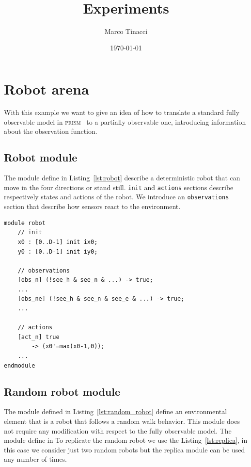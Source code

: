 \documentclass{article}
\date{\today}
\author{Marco Tinacci}
\title{Experiments}
\newcommand{\PRISM}{\textsc{prism}}
\begin{document}
\maketitle
\section*{Robot arena} %
\label{sec:robot_arena}

With this example we want to give an idea of how to translate a standard fully observable model in \PRISM{}~\cite{KwiatkowskaNP11} to a partially observable one, introducing information about the observation function.

\subsection*{Robot module} %
\label{sub:robot_module}

The module define in Listing~\ref{lst:robot} describe a deterministic robot that can move in the four directions or stand still. \texttt{init} and \texttt{actions} sections describe respectively states and actions of the robot. We introduce an \texttt{observations} section that describe how sensors react to the environment.

\begin{lstlisting}[caption=Robot module, label=lst:robot, captionpos=b, frame=single]
module robot
	// init
	x0 : [0..D-1] init ix0;
	y0 : [0..D-1] init iy0;

	// observations
	[obs_n] (!see_h & see_n & ...) -> true;
	...
	[obs_ne] (!see_h & see_n & see_e & ...) -> true;
	...

	// actions
	[act_n]	true 
		-> (x0'=max(x0-1,0));
	...
endmodule
\end{lstlisting}

\subsection*{Random robot module} %
\label{sub:random_robot_module}

The module defined in Listing~\ref{lst:random_robot} define an environmental element that is a robot that follows a random walk behavior. This module does not require any modification with respect to the fully observable model. The module define in To replicate the random robot we use the Listing~\ref{lst:replica}, in this case we consider just two random robots but the replica module can be used any number of times.
\end{document}
